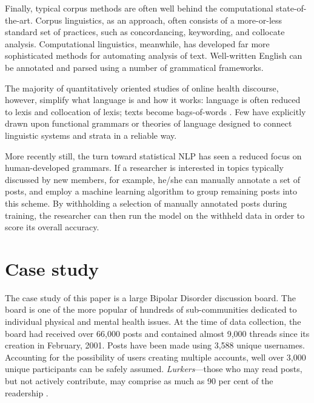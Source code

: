 \documentclass{article}
\renewcommand{\cite}{\parencite}
\begin{document}
Finally, typical corpus methods are often well behind the computational state-of-the-art. Corpus linguistics, as an approach, often consists of a more-or-less standard set of practices, such as concordancing, keywording, and collocate analysis. Computational linguistics, meanwhile, has developed far more sophisticated methods for automating analysis of text. Well-written English can be annotated and parsed using a number of grammatical frameworks.

The majority of quantitatively oriented studies of online health discourse, however, simplify what language is and how it works: language is often reduced to lexis and collocation of lexis; texts become bags-of-words \cite[e.g.][]{maclean_forum77:_2015,yesha_method_2015}. Few have explicitly drawn upon functional grammars or theories of language designed to connect linguistic systems and strata in a reliable way.

More recently still, the turn toward statistical NLP has seen a reduced focus on human-developed grammars. If a researcher is interested in topics typically discussed by new members, for example, he\slash she can manually annotate a set of posts, and employ a machine learning algorithm to group remaining posts into this scheme. By withholding a selection of manually annotated posts during training, the researcher can then run the model on the withheld data in order to score its overall accuracy.

\section{Case study}

The case study of this paper is a large Bipolar Disorder discussion board. The board is one of the more popular of hundreds of sub-communities dedicated to individual physical and mental health issues. At the time of data collection, the board had received over 66,000 posts and contained almost 9,000 threads since its creation in February, 2001. Posts have been made using 3,588 unique usernames. Accounting for the possibility of users creating multiple accounts, well over 3,000 unique participants can be safely assumed. \emph{Lurkers}---those who may read posts, but not actively contribute, may comprise as much as 90 per cent of the readership \cite{preece_top_2004}.
\end{document}
